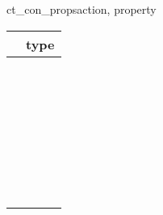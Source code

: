 \begin{methoddesc}[CS_CONNECTION]{ct_con_props}{action, property }
\begin{longtable}{l|l}
\var{property} & type \\
\hline
\code{CS_ANSI_BINDS}           & \code{bool} \\
\code{CS_ASYNC_NOTIFS}         & \code{bool} \\
\code{CS_BULK_LOGIN}           & \code{bool} \\
\code{CS_CHARSETCNV}           & \code{bool} \\
\code{CS_CONFIG_BY_SERVERNAME} & \code{bool} \\
\code{CS_DIAG_TIMEOUT}         & \code{bool} \\
\code{CS_DISABLE_POLL}         & \code{bool} \\
\code{CS_DS_COPY}              & \code{bool} \\
\code{CS_DS_EXPANDALIAS}       & \code{bool} \\
\code{CS_DS_FAILOVER}          & \code{bool} \\
\code{CS_EXPOSE_FMTS}          & \code{bool} \\
\code{CS_EXTERNAL_CONFIG}      & \code{bool} \\
\code{CS_EXTRA_INF}            & \code{bool} \\
\code{CS_HIDDEN_KEYS}          & \code{bool} \\
\code{CS_LOGIN_STATUS}         & \code{bool} \\
\code{CS_NOCHARSETCNV_REQD}    & \code{bool} \\
\code{CS_SEC_APPDEFINED}       & \code{bool} \\
\code{CS_SEC_CHALLENGE}        & \code{bool} \\
\code{CS_SEC_CHANBIND}         & \code{bool} \\
\code{CS_SEC_CONFIDENTIALITY}  & \code{bool} \\
\code{CS_SEC_DATAORIGIN}       & \code{bool} \\
\code{CS_SEC_DELEGATION}       & \code{bool} \\
\code{CS_SEC_DETECTREPLAY}     & \code{bool} \\
\code{CS_SEC_DETECTSEQ}        & \code{bool} \\
\code{CS_SEC_ENCRYPTION}       & \code{bool} \\
\code{CS_SEC_EXTENDED_ENCRYPTION} & \code{bool} \\
\code{CS_SEC_INTEGRITY}        & \code{bool} \\
\code{CS_SEC_MUTUALAUTH}       & \code{bool} \\
\code{CS_SEC_NEGOTIATE}        & \code{bool} \\
\code{CS_SEC_NETWORKAUTH}      & \code{bool} \\
\code{CS_SEC_EXTENDED_ENCRYPTION} & \code{bool} \\


\end{longtable}
\end{methoddesc}
